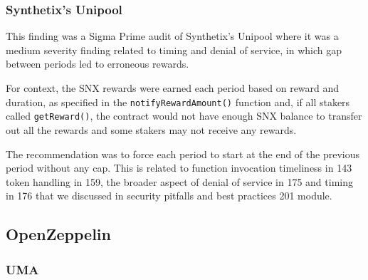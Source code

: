 \subsubsection{Synthetix's Unipool}\label{synthetixs-unipool}

This finding was a Sigma Prime audit of Synthetix's Unipool where it was
a medium severity finding related to timing and denial of service, in
which gap between periods led to erroneous rewards.

For context, the SNX rewards were earned each period based on reward and
duration, as specified in the \texttt{notifyRewardAmount()} function
and, if all stakers called \texttt{getReward()}, the contract would not
have enough SNX balance to transfer out all the rewards and some stakers
may not receive any rewards.

The recommendation was to force each period to start at the end of the
previous period without any cap. This is related to function invocation
timeliness in 143 token handling in 159, the broader aspect of denial of
service in 175 and timing in 176 that we discussed in security pitfalls
and best practices 201 module.

\subsection{OpenZeppelin}\label{openzeppelin}

\subsubsection{UMA}\label{uma}

